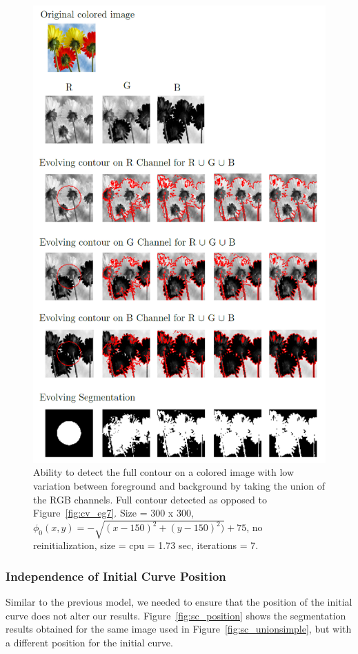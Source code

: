 \documentclass[10pt,twocolumn,letterpaper]{article}
\begin{document}
\begin{figure}[t]
\centering
\includegraphics[width=12cm]{flowers.png}
\caption{Ability to detect the full contour on a colored image with low variation between foreground and background by taking the union of the RGB channels.
Full contour detected as opposed to Figure~\ref{fig:cv_eg7}. Size = 300 x 300, $\phi_{0}(x,y) = - \sqrt{(x - 150)^2 + (y - 150)^2)} + 75$, no reinitialization,
size = cpu = 1.73 sec, iterations = 7.}
\label{fig:flowers}
\end{figure}


\subsubsection*{Independence of Initial Curve Position}

Similar to the previous model, we needed to ensure that the position of the initial curve does not alter our results. Figure~\ref{fig:sc_position} shows
the segmentation results obtained for the same image used in Figure~\ref{fig:sc_unionsimple}, but with a different position for the initial curve.
\end{document}
